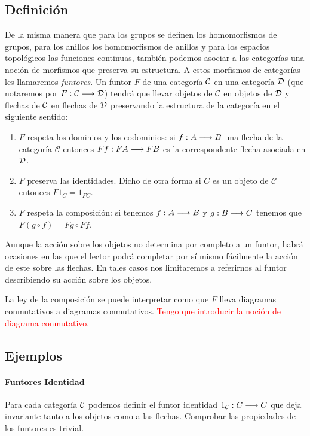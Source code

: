 \subsection{Definición}
De la misma manera que para los grupos se definen los homomorfismos
de grupos, para los anillos los homomorfismos de anillos y para los
espacios topológicos las funciones continuas, también
podemos asociar a las categorías una noción de morfismos que preserva
su estructura. A estos morfismos de categorías les llamaremos
\emph{funtores}. Un funtor $F$ de una categoría
$\mathcal{C}$ en una categoría $\mathcal{D}$ (que notaremos por $F : \mathcal{C}\longrightarrow \mathcal{D}$)
tendrá que llevar objetos de $\mathcal{C}$ en objetos de $\mathcal{D}$ y flechas
de $\mathcal{C}$ en flechas de $\mathcal{D}$ preservando la estructura de la
categoría en el siguiente sentido:
\begin{enumerate}
\item $F$ respeta los dominios y los codominios:
si $f : A\longrightarrow B$ una flecha
de la categoría $\mathcal{C}$ entonces
$F f : F A\longrightarrow F B$ es la correspondente flecha asociada
en $\mathcal{D}$.
\item $F$ preserva las identidades. Dicho de otra forma si $C$ es un
objeto de $\mathcal{C}$ entonces $F 1_C = 1_{F C}$.
\item $F$ respeta la composición: si tenemos $f: A\longrightarrow B$ y
$g : B\longrightarrow C$ tenemos que $F (g\circ f) = F g \circ F f$.
\end{enumerate}

Aunque la acción sobre los objetos
no determina por completo a un funtor, habrá ocasiones en las que
el lector podrá completar por sí mismo fácilmente la acción de este
sobre las flechas. En tales casos nos limitaremos a referirnos
al funtor describiendo su acción sobre los objetos.

La ley de la composición se puede interpretar como que $F$ lleva
diagramas conmutativos a diagramas conmutativos. \textcolor{red}{Tengo que introducir la noción de diagrama conmutativo}.


\subsection{Ejemplos}
\paragraph{Funtores Identidad}
Para cada categoría $\mathcal{C}$ podemos definir el funtor identidad
$1_{\mathcal{C}} : C\longrightarrow C$ que deja invariante tanto a los objetos
como a las flechas. Comprobar las propiedades de los funtores
es trivial.

